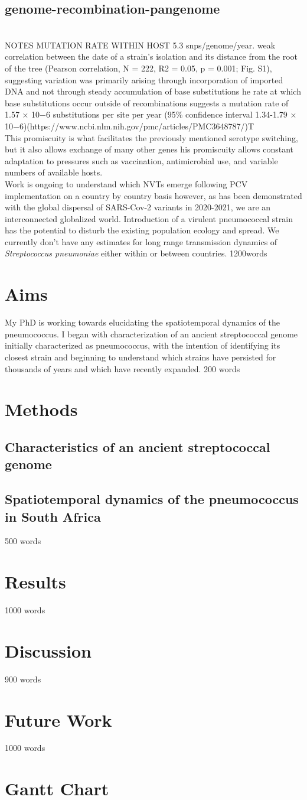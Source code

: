 \documentclass{article}
\begin{document}
\subsection{genome-recombination-pangenome}
\\ NOTES MUTATION RATE WITHIN HOST 5.3 snps/genome/year. weak correlation between the date of a strain’s isolation and its distance from the root of the tree (Pearson correlation, N = 222, R2 = 0.05, p = 0.001; Fig. S1), suggesting variation was primarily arising through incorporation of imported DNA and not through steady accumulation of base substitutions he rate at which base substitutions occur outside of recombinations suggests a mutation rate of 1.57 × 10−6 substitutions per site per year (95\% confidence interval 1.34-1.79 × 10−6)(https://www.ncbi.nlm.nih.gov/pmc/articles/PMC3648787/)T
\\This promiscuity is what facilitates the previously mentioned serotype switching, but it also allows exchange of many other genes 
his promiscuity allows constant adaptation to pressures such as vaccination, antimicrobial use, and variable numbers of available hosts. \\Work is ongoing to understand which NVTs emerge following PCV implementation on a country by country basis however, as has been demonstrated with the global dispersal of SARS-Cov-2 variants in 2020-2021, we are an interconnected globalized world. Introduction of a virulent pneumococcal strain has the potential to disturb the existing population ecology and spread. We currently don't have any estimates for long range transmission dynamics of \textit{Streptococcus pneumoniae} either within or between countries. 
1200words
\section{Aims}
My PhD is working towards elucidating the spatiotemporal dynamics of the pneumococcus. I began with characterization of an ancient streptococcal genome initially characterized as pneumococcus, with the intention of identifying its closest strain and beginning to understand which strains have persisted for thousands of years and which have recently expanded. 
200 words
\section{Methods}
\subsection{Characteristics of an ancient streptococcal genome}
\subsection{Spatiotemporal dynamics of the pneumococcus in South Africa}
500 words
\section{Results}
1000 words
\section{Discussion}
900 words
\section{Future Work}
1000 words
\section{Gantt Chart}
\printbibliography
\end{document}
